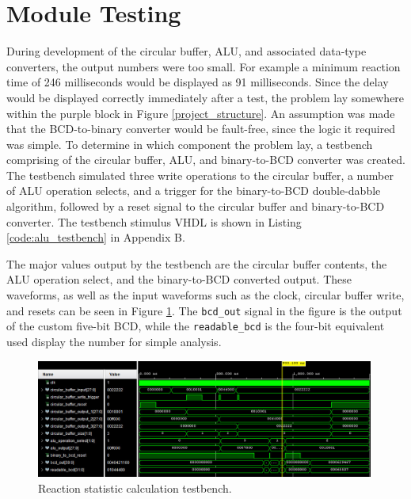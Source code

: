 \documentclass[11pt]{article}
\begin{document}

\section{Module Testing}


During development of the circular buffer, ALU, and associated data-type converters, the output numbers were too small. For example a minimum reaction time of 246 milliseconds would be displayed as 91 milliseconds. Since the delay would be displayed correctly immediately after a test, the problem lay somewhere within the purple block in Figure \ref{project_structure}. An assumption was made that the BCD-to-binary converter would be fault-free, since the logic it required was simple. To determine in which component the problem lay, a testbench comprising of the circular buffer, ALU, and binary-to-BCD converter was created. The testbench simulated three write operations to the circular buffer, a number of ALU operation selects, and a trigger for the binary-to-BCD double-dabble algorithm, followed by a reset signal to the circular buffer and binary-to-BCD converter. The testbench stimulus VHDL is shown in Listing \ref{code:alu_testbench} in Appendix B.

The major values output by the testbench are the circular buffer contents, the ALU operation select, and the binary-to-BCD converted output. These waveforms, as well as the input waveforms such as the clock, circular buffer write, and resets can be seen in Figure \ref{fig:alu_testbench}. The \texttt{bcd\_out} signal in the figure is the output of the custom five-bit BCD, while the \texttt{readable\_bcd} is the four-bit equivalent used display the number for simple analysis.

\begin{figure}[H]
	\centering
	\includegraphics[width=0.99\textwidth]{thing.jpeg}
	\caption{Reaction statistic calculation testbench.}
	\label{fig:alu_testbench}
\end{figure}
\end{document}
